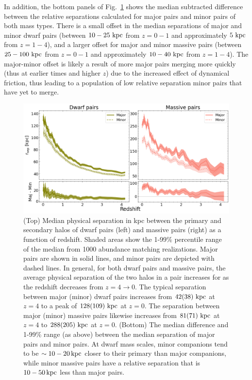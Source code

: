 \documentclass[twocolumn]{aastex631}
\begin{document}
        In addition, the bottom panels of Fig.~\ref{fig:sep} shows the median subtracted difference between the relative separations calculated for major pairs and minor pairs of both mass types. 
        There is a small offset in the median separations of major and minor dwarf pairs (between $10-25\,\mathrm{\,kpc}$ from  $z=0-1$ and approximately $5\,\mathrm{\,kpc}$ from $z=1-4$), and a larger offset for major and minor massive pairs (between $25-100\,\mathrm{\,kpc}$ from  $z=0-1$ and approximately $10-40\,\mathrm{\,kpc}$ from $z=1-4$). 
        The major-minor offset is likely a result of more major pairs merging more quickly (thus at earlier times and higher $z$) due to the increased effect of dynamical friction, thus leading to a population of low relative separation minor pairs that have yet to merge.  
    
        \begin{figure}[htp]
          \centering
          \includegraphics[width=\textwidth]{sep_1000.png}
          \caption{(Top) Median physical separation in kpc between the primary and secondary halos of dwarf pairs (left) and massive pairs (right) as a function of redshift. 
          Shaded areas show the 1-99\% percentile range of the median from 1000 abundance matching realizations. 
          Major pairs are shown in solid lines, and minor pairs are depicted with dashed lines.
          In general, for both dwarf pairs and massive pairs, the average physical separation of the two halos in a pair increases for as the redshift decreases from $z=4\to0$. 
          The typical separation between major (minor) dwarf pairs increases from $42(38)\,\mathrm{\,kpc}$ at $z=4$ to a peak of $128(109)\,\mathrm{\,kpc}$ at $z=0$.
          The separation between major (minor) massive pairs likewise increases from $81(71)\,\mathrm{\,kpc}$ at $z=4$ to $288(205)\,\mathrm{\,kpc}$ at  $z=0$.
          (Bottom) The median difference and 1-99\% range (as above) between the median separation of major pairs and minor pairs.
          At dwarf mass scales, minor companions tend to be $\sim10-20\mathrm{\,kpc}$ closer to their primary than major companions, while minor massive pairs have a relative separation that is $10-50\mathrm{\,kpc}$ less than major pairs.
            }
          \label{fig:sep}
        \end{figure}
    
\end{document}
